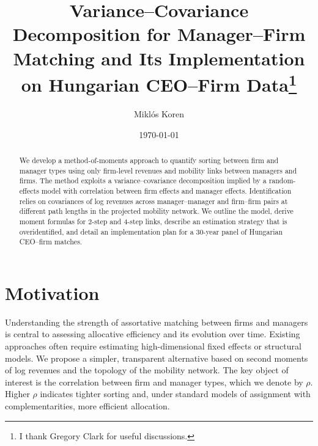 \documentclass[11pt]{article}
\title{Variance--Covariance Decomposition for Manager--Firm Matching and Its Implementation on Hungarian CEO--Firm Data\thanks{I thank Gregory Clark for useful discussions.}}
\author{Miklós Koren}
\date{\today}
\begin{document}
\maketitle

\begin{abstract}
We develop a method-of-moments approach to quantify sorting between firm and manager types using only firm-level revenues and mobility links between managers and firms. The method exploits a variance--covariance decomposition implied by a random-effects model with correlation between firm effects and manager effects. Identification relies on covariances of log revenues across manager--manager and firm--firm pairs at different path lengths in the projected mobility network. We outline the model, derive moment formulas for 2-step and 4-step links, describe an estimation strategy that is overidentified, and detail an implementation plan for a 30-year panel of Hungarian CEO--firm matches.
\end{abstract}

\section{Motivation}
Understanding the strength of assortative matching between firms and managers is central to assessing allocative efficiency and its evolution over time. Existing approaches often require estimating high-dimensional fixed effects or structural models. We propose a simpler, transparent alternative based on second moments of log revenues and the topology of the mobility network. The key object of interest is the correlation between firm and manager types, which we denote by $\rho$. Higher $\rho$ indicates tighter sorting and, under standard models of assignment with complementarities, more efficient allocation.
\end{document}
